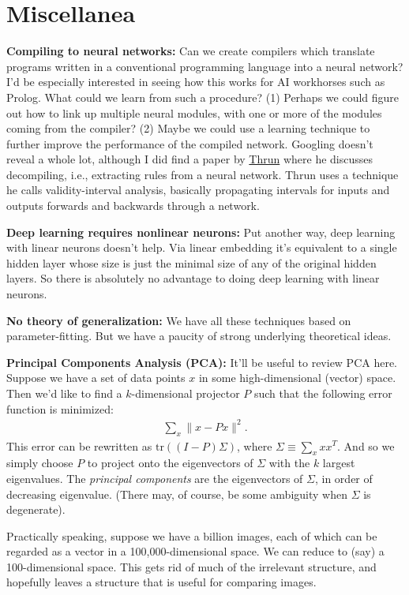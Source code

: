 \documentclass[12pt]{report}
\newcommand{\link}[2]{\href{#1}{#2}}
\begin{document}
\chapter{Miscellanea}

\textbf{Compiling to neural networks:} Can we create compilers which
translate programs written in a conventional programming language into
a neural network?  I'd be especially interested in seeing how this
works for AI workhorses such as Prolog.  What could we learn from such
a procedure?  (1) Perhaps we could figure out how to link up multiple
neural modules, with one or more of the modules coming from the
compiler? (2) Maybe we could use a learning technique to further
improve the performance of the compiled network.  Googling doesn't
reveal a whole lot, although I did find a paper by
\link{http://scholar.google.ca/scholar?cluster=10518384657895134615\&hl=en\&as\_sdt=0,5}{Thrun}
where he discusses decompiling, i.e., extracting rules from a neural
network.  Thrun uses a technique he calls validity-interval analysis,
basically propagating intervals for inputs and outputs forwards and
backwards through a network.

\textbf{Deep learning requires nonlinear neurons:} Put another way,
deep learning with linear neurons doesn't help.  Via linear embedding
it's equivalent to a single hidden layer whose size is just the
minimal size of any of the original hidden layers.  So there is
absolutely no advantage to doing deep learning with linear neurons.

\textbf{No theory of generalization:} We have all these techniques
based on parameter-fitting.  But we have a paucity of strong
underlying theoretical ideas.

\textbf{Principal Components Analysis (PCA):} It'll be useful to
review PCA here.  Suppose we have a set of data points $x$ in some
high-dimensional (vector) space.  Then we'd like to find a
$k$-dimensional projector $P$ such that the following error function
is minimized:
\begin{eqnarray}
\sum_x \| x-Px \|^2.
\end{eqnarray}
This error can be rewritten as $\mbox{tr}((I-P)\Sigma)$, where $\Sigma
\equiv \sum_x x x^T$.  And so we simply choose $P$ to project onto the
eigenvectors of $\Sigma$ with the $k$ largest eigenvalues.  The
\emph{principal components} are the eigenvectors of $\Sigma$, in order
of decreasing eigenvalue.  (There may, of course, be some ambiguity
when $\Sigma$ is degenerate).

Practically speaking, suppose we have a billion images, each of which
can be regarded as a vector in a 100,000-dimensional space.  We can
reduce to (say) a 100-dimensional space.  This gets rid of much of the
irrelevant structure, and hopefully leaves a structure that is useful
for comparing images.
\end{document}
